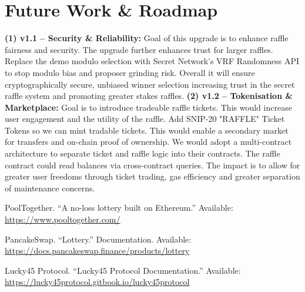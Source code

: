 \documentclass[9pt]{extarticle}
\begin{document}
\section{Future Work \& Roadmap}

\textbf{(1) v1.1 – Security \& Reliability:} Goal of this upgrade is to enhance raffle fairness and security. The upgrade further enhances trust for larger raffles. Replace the demo modulo selection with Secret Network's VRF Randomness API to stop modulo bias and proposer grinding risk. Overall it will ensure cryptographically secure, unbiased winner selection increasing trust in the secret raffle system and promoting greater stakes raffles. \textbf{(2) v1.2 – Tokenisation \& Marketplace:} Goal is to introduce tradeable raffle tickets. This would increase user engagement and the utility of the raffle. Add SNIP-20 "RAFFLE" Ticket Tokens so we can mint tradable tickets. This would enable a secondary market for transfers and on-chain proof of ownership. We would adopt a multi-contract architecture to separate ticket and raffle logic into their contracts. The raffle contract could read balances via cross-contract queries. The impact is to allow for greater user freedoms through ticket trading, gas efficiency and greater separation of maintenance concerns.

{\small
\begin{thebibliography}{9}

PoolTogether. ``A no-loss lottery built on Ethereum.'' Available: \url{https://www.pooltogether.com/}

PancakeSwap. ``Lottery.'' Documentation. Available: \url{https://docs.pancakeswap.finance/products/lottery}

Lucky45 Protocol. ``Lucky45 Protocol Documentation.'' Available: \url{https://lucky45protocol.gitbook.io/lucky45protocol}
\end{thebibliography}}

\newpage

\end{document}
